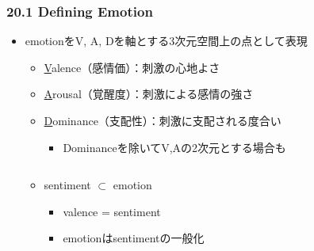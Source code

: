 \begin{frame}
    \frametitle{20.1 Defining Emotion}
    \begin{itemize}
        \item emotionをV, A, Dを軸とする3次元空間上の点として表現
        \begin{itemize}
            \item \underline{V}alence（感情価）：刺激の心地よさ
            \item \underline{A}rousal（覚醒度）：刺激による感情の強さ
            \item \underline{D}ominance（支配性）：刺激に支配される度合い
            \begin{itemize}
                \item Dominanceを除いてV,Aの2次元とする場合も
            \end{itemize}
        \end{itemize}
        \begin{columns}
            \begin{column}[T]{0.575\textwidth}
                \begin{itemize}
                    \item sentiment $\subset$ emotion
                    \begin{itemize}
                        \item valence = sentiment
                        \item emotionはsentimentの一般化
                    \end{itemize}
                \end{itemize}
            \end{column}
            \begin{column}[T]{0.375\textwidth}
            \end{column}
        \end{columns}
    \end{itemize}
\end{frame}
